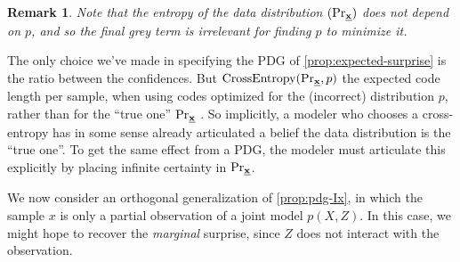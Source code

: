 \documentclass[twoside]{article}
\theoremstyle{plain}
\newtheorem{remark}{Remark}
\theoremstyle{definition}
\let\H\relax
\DeclareMathOperator{\H}{\mathrm{H}} %
\newcommand{\datadist}[1]{\Pr\nolimits_{#1}}
\begin{document}
\begin{remark}
Note that the entropy of the data distribution $\H(\datadist\xsamp)$ does not depend on $p$, and so the final grey term is irrelevant for finding $p$ to minimize it.
\end{remark}

The only choice we've made in specifying the PDG of \cref{prop:expected-surprise} is the ratio between the confidences.
But $\mathrm{CrossEntropy}(\datadist\xsamp,p)$ the expected code length per sample, when using codes optimized for the (incorrect) distribution $p$, rather than for the ``true one'' $\datadist\xsamp$ \cite{mackay2003information}.
So implicitly, a modeler who chooses a cross-entropy has in some sense already articulated a belief the data distribution is the ``true one''. 
To get the same effect from a PDG, the modeler must articulate this explicitly by placing infinite certainty in $\datadist\xsamp$.

We now consider an orthogonal generalization of \cref{prop:pdg-Ix}, in which the sample $x$ is only a partial observation of a joint model $p(X,Z)$. In this case, we might hope to recover the \emph{marginal} surprise, since $Z$ does not interact with the observation. %
\end{document}
